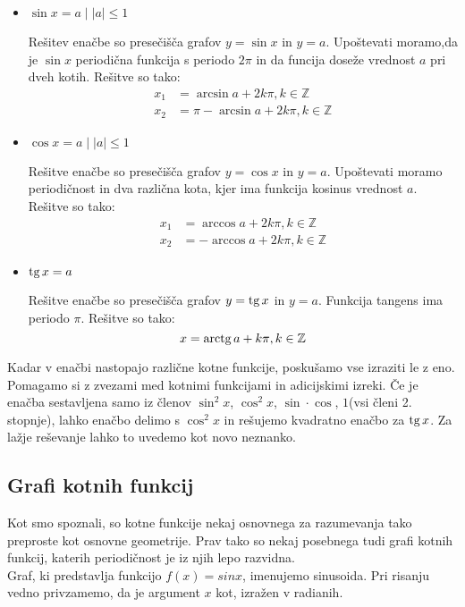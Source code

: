 \begin{itemize}
\item $\sin x=a \mid |a|\le 1$

Rešitev enačbe so presečišča grafov $y=\sin x$ in $y=a$. Upoštevati moramo,da je $\sin x$ periodična funkcija s periodo $2\pi$ in da funcija doseže vrednost $a$ pri dveh kotih. Rešitve so tako:
\begin{align*}
x_1&= \arcsin a + 2k\pi, k\in \mathbb{Z} \\
x_2&= \pi -\arcsin a + 2k\pi, k\in \mathbb{Z}
\end{align*}

\item $\cos x=a \mid |a|\le 1$

Rešitve enačbe so presečišča grafov $y=\cos x$ in $y=a$. Upoštevati moramo periodičnost in dva različna kota, kjer ima funkcija kosinus vrednost $a$. Rešitve so tako:
\begin{align*}
x_1&= \arccos a + 2k\pi, k\in \mathbb{Z} \\
x_2&= -\arccos a + 2k\pi, k\in \mathbb{Z}
\end{align*}

\item $\operatorname{tg} x =a$

Rešitve enačbe so presečišča grafov $y=\operatorname{tg} x$ in $y=a$. Funkcija tangens ima periodo $\pi$. Rešitve so tako:
\begin{equation*}
x= \operatorname{arctg} a +k\pi, k \in \mathbb{Z}
\end{equation*}
\end{itemize}

Kadar v enačbi nastopajo različne kotne funkcije, poskušamo vse izraziti le z eno. Pomagamo si z zvezami med kotnimi funkcijami in adicijskimi izreki. Če je enačba sestavljena samo iz členov $\sin^2x$, $\cos^2x$, $\sin\cdot\cos$, $1$(vsi členi 2. stopnje), lahko enačbo delimo s $\cos^2x$ in rešujemo kvadratno enačbo za $\operatorname{tg} x$. Za lažje reševanje lahko to uvedemo kot novo neznanko. 

\subsection{Grafi kotnih funkcij}
Kot smo spoznali, so kotne funkcije nekaj osnovnega za razumevanja tako preproste kot osnovne geometrije. Prav tako so nekaj posebnega tudi grafi kotnih funkcij, katerih periodičnost je iz njih lepo razvidna. \\

Graf, ki predstavlja funkcijo $f(x) = sinx$, imenujemo sinusoida. Pri risanju vedno privzamemo, da je argument $x$ kot, izražen v radianih.

